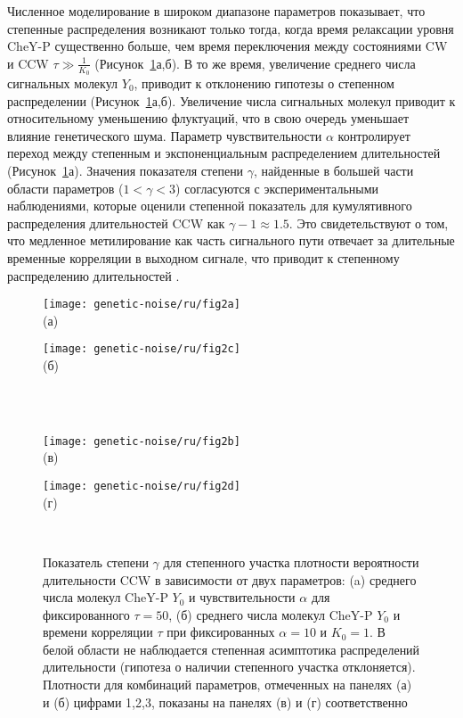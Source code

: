 Численное моделирование в широком диапазоне параметров показывает, что степенные распределения возникают только тогда, когда время релаксации уровня CheY-P существенно больше, чем время переключения между состояниями CW и CCW $\tau \gg \frac{1}{K_0}$ (Рисунок~\cref{fig:pdf-gamma-grid-1}а,б). В то же время, увеличение среднего числа сигнальных молекул $Y_0$, приводит к отклонению гипотезы о степенном распределении (Рисунок~\cref{fig:pdf-gamma-grid-1}а,б). Увеличение числа сигнальных молекул приводит к относительному уменьшению флуктуаций, что в свою очередь уменьшает влияние генетического шума. Параметр чувствительности $\alpha$ контролирует переход между степенным и экспоненциальным распределением длительностей (Рисунок~\cref{fig:pdf-gamma-grid-1}а). Значения показателя степени $\gamma$, найденные в большей части области параметров ($1 < \gamma < 3$) согласуются с экспериментальными наблюдениями, которые оценили степенной показатель для кумулятивного распределения длительностей CCW как $\gamma - 1 \approx 1.5$. Это свидетельствуют о том, что медленное метилирование как часть сигнального пути отвечает за длительные временные корреляции в выходном сигнале, что приводит к степенному распределению длительностей \cite{korobkova_molecular_2004}. 


\begin{figure}[!ht]
    \begin{minipage}[b][][b]{0.49\linewidth}\centering
        \texttt{[image: genetic-noise/ru/fig2a]} \\ (а)
    \end{minipage}
    \hfill
    \begin{minipage}[b][][b]{0.49\linewidth}\centering
        \texttt{[image: genetic-noise/ru/fig2c]} \\ (б)
    \end{minipage}\\ \\
    \begin{minipage}[b][][b]{0.49\linewidth}\centering
        \texttt{[image: genetic-noise/ru/fig2b]} \\ (в)
    \end{minipage}
    \hfill
    \begin{minipage}[b][][b]{0.49\linewidth}\centering
        \texttt{[image: genetic-noise/ru/fig2d]} \\ (г)
    \end{minipage} \\
    \caption{
        Показатель степени $\gamma$ для степенного участка плотности вероятности длительности CCW в зависимости от двух параметров: (a) среднего числа молекул CheY-P $Y_0$ и чувствительности $\alpha$ для фиксированного $\tau = 50$, (б) среднего числа молекул CheY-P $Y_0$ и времени корреляции $\tau$ при фиксированных $\alpha = 10$ и $K_0 = 1$. В белой области не наблюдается степенная асимптотика распределений длительности (гипотеза о наличии степенного участка отклоняется). Плотности для комбинаций параметров, отмеченных на панелях (а) и (б) цифрами 1,2,3, показаны на панелях (в) и (г) соответственно
    }\label{fig:pdf-gamma-grid-1}
\end{figure}

